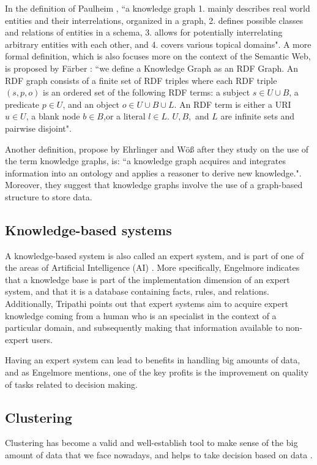 \documentclass[runningheads]{llncs}
\begin{document}
In the definition of Paulheim \cite{Paulheim}, ``a knowledge graph
1. mainly describes real world entities and their interrelations, organized in a graph, 2. defines possible classes and relations of entities in a schema, 3. allows for potentially interrelating arbitrary entities with each other, and 4. covers various topical domains". A more formal definition, which is also focuses more on the context of the Semantic Web, is proposed by F{\"a}rber \cite{Farber}: ``we define a Knowledge Graph as an RDF Graph. An RDF graph consists of a finite set of RDF triples where each RDF triple $(s, p, o)$ is an ordered set of the following RDF terms: a subject $s \in U ∪ B$, a predicate $p \in U$, and an object $o \in U ∪ B ∪ L$. An RDF term is either a URI $u \in U$, a blank node $b \in B$,or a literal $l \in L$. $U, B,$ and $L$ are infinite sets and pairwise disjoint".

Another definition, propose by Ehrlinger and W{\"o}{\ss} \cite{Ehrlinger} after they study on the use of the term knowledge graphs, is: ``a knowledge graph acquires and integrates information into an ontology and applies a reasoner to derive new knowledge.". Moreover, they suggest that knowledge graphs involve the use of a graph-based structure to store data.


\subsection{Knowledge-based systems}
A knowledge-based system is also called an expert system, and is part of one of the areas of Artificial Intelligence (AI) \cite{Tripathi}. More specifically, Engelmore \cite{Engelmore} indicates that a knowledge base is part of the implementation dimension of an expert system, and that it is a database containing facts, rules, and relations. Additionally, Tripathi \cite{Tripathi} points out that expert systems aim to acquire expert knowledge coming from a human who is an specialist in the context of a particular domain, and subsequently making that information available to non-expert users.

Having an expert system can lead to benefits in handling big amounts of data, and as Engelmore \cite{Engelmore} mentions, one of the key profits is the improvement on quality of tasks related to decision making.


\subsection{Clustering}
Clustering has become a valid and well-establish tool to make sense of the big amount of data that we face nowadays, and helps to take decision based on data \cite{Pedrycz}.
\end{document}
